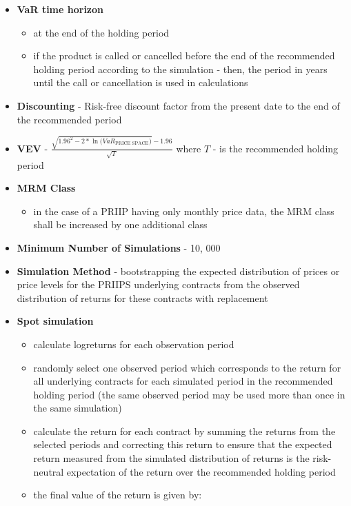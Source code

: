 \documentclass{report}
\begin{document}
\begin{itemize}
	\item \textbf{VaR time horizon}
	\begin{itemize}
		\item at the end of the holding period
		\item if the product is
		called or cancelled before the end of the recommended holding period according to the simulation - then, the period in years until the call or cancellation is used in calculations
	\end{itemize}
	\item \textbf{Discounting} - Risk-free discount factor from the present date to the end of the recommended period
	\item \textbf{VEV} - $\frac{\sqrt{1.96^{2} - 2 * \ln{\Big(VaR_{\text{PRICE SPACE}}\Big)}} - 1.96}{\sqrt{T}}$ where $T$ - is the recommended holding period
	\item \textbf{MRM Class}
	\begin{itemize}
		\item in the case of a PRIIP having only monthly price data, the MRM class shall be increased by one additional class 
	\end{itemize}
	\item \textbf{Minimum Number of Simulations} - 10, 000
	\item \textbf{Simulation Method} - bootstrapping the expected distribution of prices or price levels for the PRIIPS underlying contracts from the observed distribution of returns for these contracts with replacement
	\item \textbf{Spot simulation}
	\begin{itemize}
			\item calculate logreturns for each observation period
			\item randomly select one observed period which corresponds to the return for all underlying contracts for each simulated period in the recommended holding period (the same observed period may be used more than once in the same simulation)
			\item calculate the return for each contract by summing the returns from the selected periods and correcting this return to ensure that the expected return measured from the simulated distribution of returns is the risk-neutral expectation of the return over the recommended holding period
			\item the final value of the return is given by:
			\begin{eqnarray}

\end{eqnarray}
\end{itemize}
\end{itemize}
\end{document}
